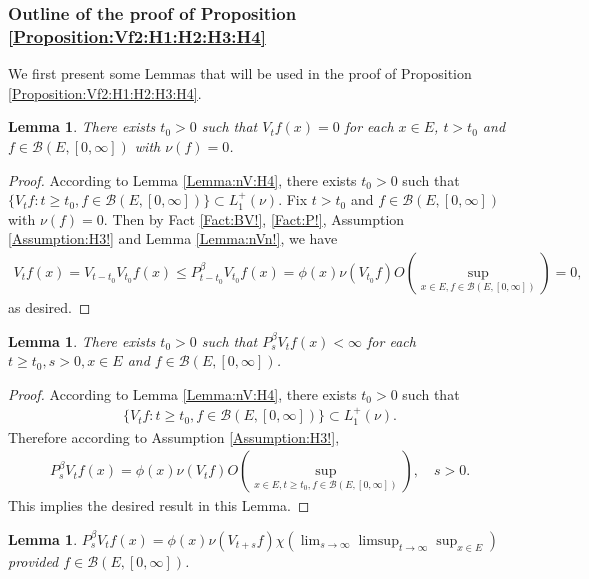 \documentclass[12pt,a4paper]{amsart}
\numberwithin{equation}{section}
\theoremstyle{plain}
\newtheorem{lem}[thm]{Lemma}
\theoremstyle{definition}
\theoremstyle{remark}
\begin{document}
\subsubsection{Outline of the proof of Proposition \ref{Proposition:Vf2:H1:H2:H3:H4}}
We first present some Lemmas that will be used in the proof of Proposition \ref{Proposition:Vf2:H1:H2:H3:H4}.
\begin{lem} \label{Lemma:nullVf:H3:H4}
There exists $t_0>0$ such that $V_t f(x ) = 0$ for each $x\in E$, $t > t_0$ and $f \in \mathcal B(E,[0,\infty])$ with $\nu(f) = 0$.
\end{lem}
\begin{proof}
According to Lemma \ref{Lemma:nV:H4}, there exists $t_0> 0$ such that $\{V_t f: t \geq t_0, f \in \mathcal B(E,[0,\infty])\} \subset L_1^+(\nu). $
Fix $t>t_0$ and $f \in \mathcal B(E,[0,\infty])$ with $\nu(f) = 0$. 
Then by Fact \ref{Fact:BV!}, \ref{Fact:P!}, Assumption \ref{Assumption:H3!} and Lemma \ref{Lemma:nVn!}, we have
\begin{align}V_tf(x) = V_{t-t_0} V_{t_0}f(x)
 \leq P_{t - t_0}^\beta V_{t_0} f(x)
 = \phi(x)\nu(V_{t_0} f) O(\sup_{x\in E, f\in \mathcal B(E,[0,\infty])})
 = 0,
\end{align}
as desired.
\end{proof}
\begin{lem} \label{Lemma:PV:H3:H4} 
There exists $t_0>0$ such that $P_s^\beta V_t f(x) < \infty$ for each $t \geq t_0, s> 0, x\in E$ and $f\in \mathcal B(E,[0,\infty])$.
\end{lem}
\begin{proof}
According to Lemma \ref{Lemma:nV:H4}, there exists $t_0> 0$ such that 
\begin{align}
 \{V_t f: t \geq t_0, f \in \mathcal B(E,[0,\infty])\} 
 \subset L_1^+(\nu).
 \end{align}
Therefore according to Assumption \ref{Assumption:H3!}, 
\begin{align}
 P_s^\beta V_tf(x)
 = \phi(x)\nu(V_tf) O(\sup_{x\in E, t\geq t_0, f\in \mathcal B(E,[0,\infty])}),
 \quad s>0.
 \end{align}
This implies the desired result in this Lemma.
\end{proof}
\begin{lem} \label{Lemma:PVf:H1:H2:H3:H4} 
$P_s^\beta V_t f(x) = \phi(x) \nu(V_{t+s}f) \chi (\lim_{s\to \infty} \limsup_{t\to \infty} \sup_{x\in E})$ provided $f\in \mathcal B(E,[0,\infty])$.
\end{lem}
\end{document}
